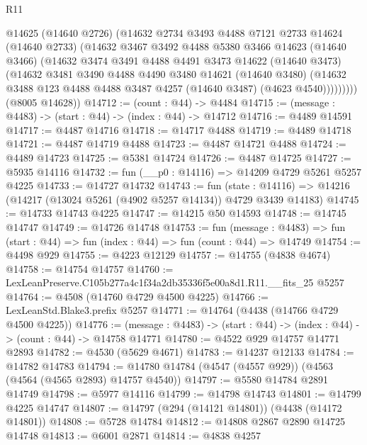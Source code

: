 \begin{lexlean}{R11}
\begin{coremodule}
            @14625
            (@14640 @2726)
            (@14632
              @2734
              @3493
              @4488
              @7121
              @2733
              @14624
              (@14640 @2733)
              (@14632
                @3467
                @3492
                @4488
                @5380
                @3466
                @14623
                (@14640 @3466)
                (@14632
                  @3474
                  @3491
                  @4488
                  @4491
                  @3473
                  @14622
                  (@14640 @3473)
                  (@14632
                    @3481
                    @3490
                    @4488
                    @4490
                    @3480
                    @14621
                    (@14640 @3480)
                    (@14632 @3488 @123 @4488 @4488 @3487 @4257 (@14640 @3487) (@4623 @4540)))))))))
      (@8005 @14628))
@14712 := (count : @44) -> @4484
@14715 := (message : @4483) -> (start : @44) -> (index : @44) -> @14712
@14716 := @4489 @14591
@14717 := @4487 @14716
@14718 := @14717 @4488
@14719 := @4489 @14718
@14721 := @4487 @14719 @4488
@14723 := @4487 @14721 @4488
@14724 := @4489 @14723
@14725 := @5381 @14724
@14726 := @4487 @14725
@14727 := @5935 @14116
@14732 := fun (__p0 : @14116) => @14209 @4729 @5261 @5257 @4225
@14733 := @14727 @14732
@14743 := fun (state : @14116) =>
  @14216 (@14217 (@13024 @5261 (@4902 @5257 @14134)) @4729 @3439 @14183)
@14745 := @14733 @14743 @4225
@14747 := @14215 @50 @14593
@14748 := @14745 @14747
@14749 := @14726 @14748
@14753 := fun (message : @4483) =>
  fun (start : @44) => fun (index : @44) => fun (count : @44) => @14749
@14754 := @4498 @929
@14755 := @4223 @12129
@14757 := @14755 (@4838 @4674)
@14758 := @14754 @14757
@14760 := LexLeanPreserve.C105b277a4c1f34a2db35336f5e00a8d1.R11.__fits_25 @5257
@14764 := @4508 (@14760 @4729 @4500 @4225)
@14766 := LexLeanStd.Blake3.prefix @5257
@14771 := @14764 (@4438 (@14766 @4729 @4500 @4225))
@14776 := (message : @4483) -> (start : @44) -> (index : @44) -> (count : @44) -> @14758 @14771
@14780 := @4522 @929 @14757 @14771 @2893
@14782 := @4530 (@5629 @4671)
@14783 := @14237 @12133
@14784 := @14782 @14783
@14794 := @14780 @14784 (@4547 (@4557 @929)) (@4563 (@4564 (@4565 @2893) @14757 @4540))
@14797 := @5580 @14784 @2891 @14749
@14798 := @5977 @14116
@14799 := @14798 @14743
@14801 := @14799 @4225 @14747
@14807 := @14797 (@294 (@14121 @14801)) (@4438 (@14172 @14801))
@14808 := @5728 @14784
@14812 := @14808 @2867 @2890 @14725 @14748
@14813 := @6001 @2871
@14814 := @4838 @4257

\end{coremodule}
\end{lexlean}

